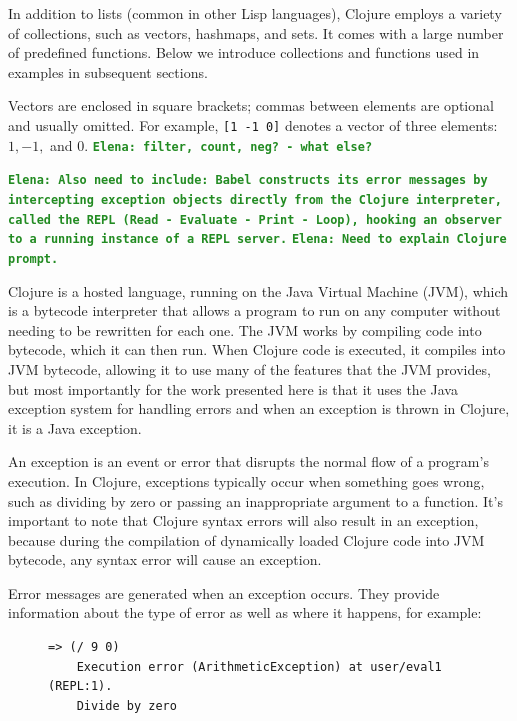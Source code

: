 \documentclass[12pt]{article}
\newcommand{\comment}[1]{{\bf \tt  {#1}}}
\newcommand{\emcomment}[1]{\textcolor{ForestGreen}{\comment{Elena: {#1}}}}
\begin{document}
In addition to lists (common in other Lisp languages), Clojure employs a variety of collections, such as vectors, hashmaps, and sets. 
It comes with a large number of predefined functions. Below we introduce collections and functions used in examples in subsequent sections. 
 
Vectors are enclosed in square brackets; commas between elements are optional and usually omitted. 
For example,  \texttt{[1 -1 0]} denotes a vector of three elements: $1, -1,$ and $0$. 
\emcomment{filter, count, neg? - what else?}

\emcomment{Also need to include:
Babel constructs its error messages by intercepting exception objects directly from the Clojure interpreter, called the REPL (Read - Evaluate - Print - Loop), hooking an observer to a running instance of a REPL server.}
\emcomment{Need to explain Clojure prompt.}


	Clojure is a hosted language, running on the Java Virtual Machine (JVM), which is a bytecode interpreter that allows a program to run on any computer without needing to be rewritten for each one. 
	The JVM works by compiling code into bytecode, which it can then run. When Clojure code is executed, it compiles into JVM bytecode, allowing it to use many of the features that the JVM provides, 
	but most importantly for the work presented here is that it uses the Java exception system for handling errors and when an exception is thrown in Clojure, it is a Java exception.

    
   An exception is an event or error that disrupts the normal flow of a program's execution. In Clojure, exceptions typically occur when something goes wrong, such as dividing by 
   zero or passing an inappropriate argument to a function. It's important to note that Clojure syntax errors will also result in an exception, because during the compilation of dynamically loaded Clojure code into JVM bytecode, 
   any syntax error will 
cause an exception.

   Error messages are generated when an exception occurs. They provide information about
   the type of error as well as where it happens, for example:

	\begin{figure}[h]
		\centering
		\begin{lstlisting}[breaklines=true, basicstyle=\ttfamily]
	=> (/ 9 0)
	Execution error (ArithmeticException) at user/eval1 (REPL:1).
	Divide by zero
		\end{lstlisting}
	\end{figure}
\end{document}
